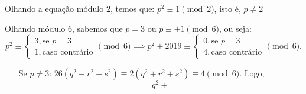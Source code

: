 Olhando a equação módulo $2$, temos que:
$p^2 \equiv 1 \pmod{2}$,
isto é, $p \neq 2$

Olhando módulo 6, sabemos que $p = 3$ ou $p \equiv \pm 1 \pmod{6}$, ou seja:
$$p^2 \equiv 
\begin{cases}
	3, \text{se } p = 3\\
	1, \text{caso contrário}
\end{cases}
\pmod{6} \implies
p^2 + 2019 \equiv 
\begin{cases}
	0, \text{se } p = 3\\
	4, \text{caso contrário}
\end{cases}
\pmod{6}.
$$

\begin{itemize}
	\item[Se $p \neq 3$:] $26(q^2 + r^2 + s^2) \equiv 2(q^2 + r^2 + s^2) \equiv 4 \pmod{6}$. Logo, $$q^2 + $$

\end{itemize}
